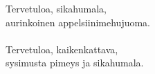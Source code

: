 
            Tervetuloa, sikahumala, \\
            aurinkoinen appelsiinimehujuoma. \\
\hspace{10mm} \\
            Tervetuloa, kaikenkattava, \\
            sysimusta pimeys ja sikahumala. \\
